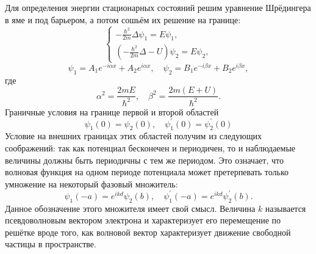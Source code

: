Для определения энергии стационарных состояний решим уравнение Шрёдингера в яме и под барьером, а потом сошьём их решение на границе:
\[
  \begin{cases}
    -\frac{\hbar^2}{2m}\Delta \psi_1 = E\psi_1,\\
    \left(-\frac{\hbar^2}{2m}\Delta - U\right) \psi_2 = E\psi_2,
  \end{cases}
\]
\[
    \psi_1 = A_1 e^{-i\alpha x} + A_2 e^{i\alpha x},\quad
    \psi_2 = B_1 e^{-i\beta x} + B_2 e^{i\beta x},
\]
где
\[
  \alpha^2 = \frac{2mE}{\hbar^2}, \quad \beta^2 = \frac{2m(E+U)}{\hbar^2}.
\]
Граничные условия на границе первой и второй областей
\[
    \psi_1(0) = \psi_2(0),\quad
    \psi_1^\prime(0) = \psi_2^\prime(0)
\]
Условие на внешних границах этих областей получим из следующих соображений: так как потенциал бесконечен и периодичен, то и наблюдаемые величины должны быть периодичны с тем же периодом. Это означает, что волновая функция на одном периоде потенциала может претерпевать только умножение на некоторый фазовый множитель:
\[
    \psi_1(-a) = e^{ikd}\psi_2(b),\quad
    \psi_1^\prime(-a) = e^{ikd}\psi_2^\prime(b).
\]
Данное обозначение этого множителя имеет свой смысл. Величина \( k \)
называется псевдоволновым вектором электрона и характеризует его перемещение по
решётке вроде того, как волновой вектор характеризует движение свободной частицы
в пространстве.


